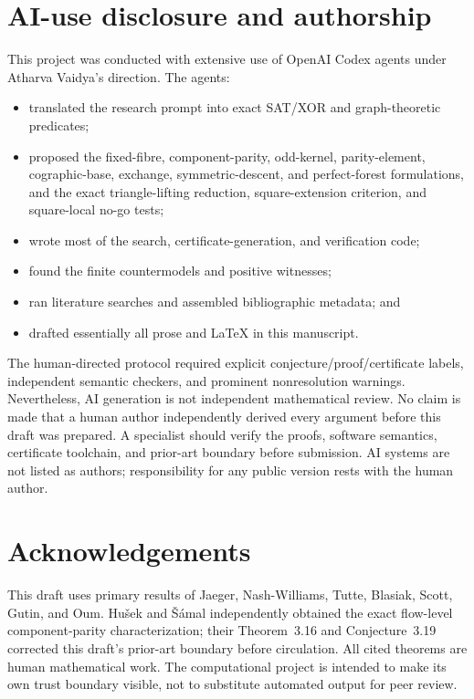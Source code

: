\documentclass[11pt]{article}
\theoremstyle{definition}
\theoremstyle{remark}
\newcommand{\1}{\mathbf 1}
\begin{document}
\section{AI-use disclosure and authorship}

This project was conducted with extensive use of OpenAI Codex agents under
Atharva Vaidya's direction.  The agents:
\begin{itemize}
\item translated the research prompt into exact SAT/XOR and graph-theoretic
      predicates;
\item proposed the fixed-fibre, component-parity, odd-kernel,
      parity-element, cographic-base, exchange, symmetric-descent, and
      perfect-forest formulations, and the exact triangle-lifting
      reduction, square-extension criterion, and square-local no-go tests;
\item wrote most of the search, certificate-generation, and verification
      code;
\item found the finite countermodels and positive witnesses;
\item ran literature searches and assembled bibliographic metadata; and
\item drafted essentially all prose and \LaTeX{} in this manuscript.
\end{itemize}

The human-directed protocol required explicit conjecture/proof/certificate
labels, independent semantic checkers, and prominent nonresolution
warnings.  Nevertheless, AI generation is not independent mathematical
review.  No claim is made that a human author independently derived every
argument before this draft was prepared.  A specialist should verify the
proofs, software semantics, certificate toolchain, and prior-art boundary
before submission.  AI systems are not listed as authors; responsibility
for any public version rests with the human author.

\section*{Acknowledgements}

This draft uses primary results of Jaeger, Nash-Williams, Tutte, Blasiak,
Scott, Gutin, and Oum.  Hu\v{s}ek and \v{S}\'amal independently obtained
the exact flow-level component-parity characterization; their
Theorem~3.16 and Conjecture~3.19 corrected this draft's prior-art boundary
before circulation.  All cited theorems are human mathematical work.  The
computational project is intended to make its own trust boundary visible,
not to substitute automated output for peer review.



\end{document}
